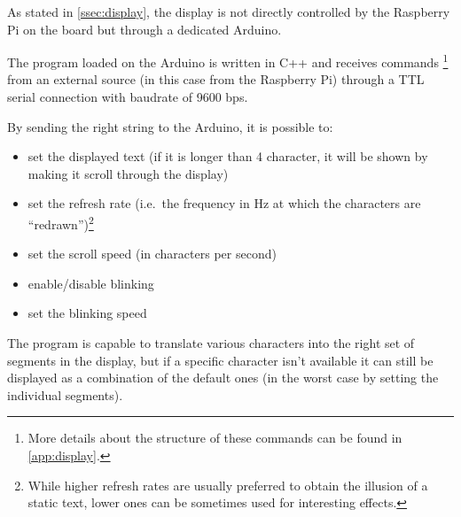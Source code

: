 As stated in \autoref{ssec:display}, the display is not directly controlled by
the Raspberry Pi on the board but through a dedicated Arduino.

The program loaded on the Arduino is written in C++ and receives commands%
\footnote{More details about the structure of these commands can be found in
\autoref{app:display}.} from an external source (in this case from the Raspberry
Pi) through a TTL serial connection with baudrate of 9600 bps.

\beforelist By sending the right string to the Arduino, it is possible to:
\begin{itemize}
\item set the displayed text (if it is longer than 4 character, it will be
  shown by making it scroll through the display)
\item set the refresh rate (i.e.\ the frequency in Hz at which the characters
  are ``redrawn'')\footnote{While higher refresh rates are usually preferred to
  obtain the illusion of a static text, lower ones can be sometimes used for
  interesting effects.}
\item set the scroll speed (in characters per second)
\item enable/disable blinking
\item set the blinking speed
\end{itemize}
\afterlist*
The program is capable to translate various characters into the right set of
segments in the display, but if a specific character isn't available it can
still be displayed as a combination of the default ones (in the worst case by
setting the individual segments).
